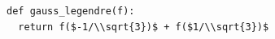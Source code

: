 \documentclass[border=10pt]{standalone}
\begin{document}
\begin{lstlisting}
def gauss_legendre(f):
  return f($-1/\\sqrt{3})$ + f($1/\\sqrt{3})$
\end{lstlisting}
\end{document}
